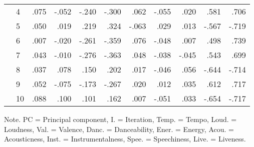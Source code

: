 \begin{table}[ht]
\begin{threeparttable}
\begin{tabular*}{\textwidth}{@{\extracolsep{\fill}}llrrrrrrrrr@{}}
   & 4         & .075  & -.052    & -.240   & -.300  & .062   & -.055   & .020    & .581    & .706     \\
   & 5         & .050  & .019     & .219    & .324   & -.063  & .029    & .013    & -.567   & -.719    \\
   & 6         & .007  & -.020    & -.261   & -.359  & .076   & -.048   & .007    & .498    & .739     \\
   & 7         & .043  & -.010    & -.276   & -.363  & .048   & -.038   & -.045   & .543    & .699     \\
   & 8         & .037  & .078     & .150    & .202   & .017   & -.046   & .056    & -.644   & -.714    \\
   & 9         & .052  & -.075    & -.173   & -.267  & .020   & .012    & .035    & .612    & .717     \\
   & 10        & .088  & .100     & .101    & .162   & .007   & -.051   & .033    & -.654   & -.717 \\
\bottomrule

\end{tabular*}
\begin{tablenotes}
\small
\item Note. PC = Principal component, I. = Iteration, Temp. = Tempo, Loud. = Loudness, Val. = Valence, Danc. = Danceability, Ener. = Energy, Acou. = Acousticness, Inst. = Instrumentalness, Spee. = Speechiness, Live. = Liveness.
\end{tablenotes}
\end{threeparttable}
\end{table}